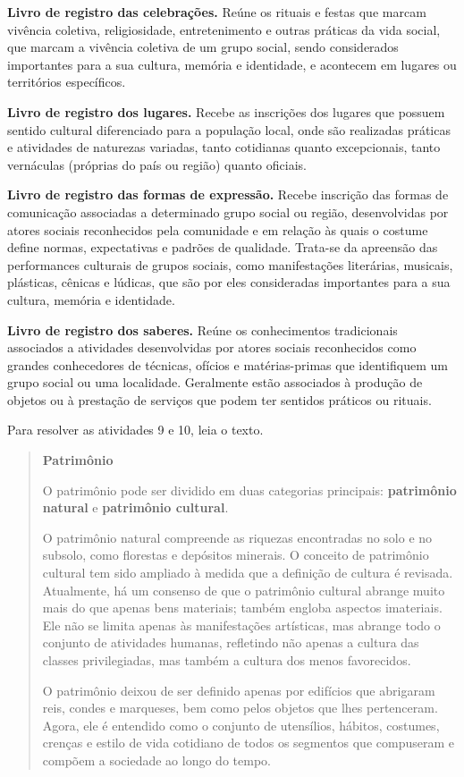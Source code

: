 \begin{boxlist}
 \textbf{Livro de registro das celebrações.} Reúne os rituais e
festas que marcam vivência coletiva, religiosidade, entretenimento e
outras práticas da vida social, que marcam a vivência coletiva de um
grupo social, sendo considerados importantes para a sua cultura, memória
e identidade, e acontecem em lugares ou territórios específicos.

 \textbf{Livro de registro dos lugares.} Recebe as inscrições dos
lugares que possuem sentido cultural diferenciado para a população
local, onde são realizadas práticas e atividades de naturezas variadas,
tanto cotidianas quanto excepcionais, tanto vernáculas (próprias do país
ou região) quanto oficiais.

 \textbf{Livro de registro das formas de expressão.} Recebe 
inscrição das formas de comunicação associadas a determinado grupo
social ou região, desenvolvidas por atores sociais reconhecidos pela
comunidade e em relação às quais o costume define normas, expectativas e
padrões de qualidade. Trata-se da apreensão das performances culturais
de grupos sociais, como manifestações literárias, musicais, plásticas,
cênicas e lúdicas, que são por eles consideradas importantes para a sua
cultura, memória e identidade.

 \textbf{Livro de registro dos saberes.} Reúne os 
conhecimentos tradicionais associados a atividades desenvolvidas 
por atores sociais reconhecidos como grandes
conhecedores de técnicas, ofícios e matérias-primas que identifiquem um
grupo social ou uma localidade. Geralmente estão associados à produção
de objetos ou à prestação de serviços que podem ter sentidos práticos ou
rituais.
\end{boxlist}

Para resolver as atividades 9 e 10, leia o texto.

\begin{quote}
\textbf{Patrimônio}

O patrimônio pode ser dividido em duas categorias principais: \textbf{patrimônio 
natural} e \textbf{patrimônio cultural}.

O patrimônio natural compreende as riquezas encontradas no solo e no subsolo, 
como florestas e depósitos minerais. O conceito de patrimônio cultural tem sido 
ampliado à medida que a definição de cultura é revisada. Atualmente, há um 
consenso de que o patrimônio cultural abrange muito mais do que apenas bens 
materiais; também engloba aspectos imateriais. Ele não se limita apenas às 
manifestações artísticas, mas abrange todo o conjunto de atividades humanas, 
refletindo não apenas a cultura das classes privilegiadas, mas também a cultura 
dos menos favorecidos.

O patrimônio deixou de ser definido apenas por edifícios que abrigaram reis, condes 
e marqueses, bem como pelos objetos que lhes pertenceram. Agora, ele é entendido 
como o conjunto de utensílios, hábitos, costumes, crenças e estilo de vida cotidiano 
de todos os segmentos que compuseram e compõem a sociedade ao longo do tempo.

\end{quote}

